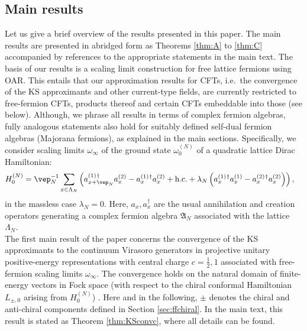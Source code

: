 \documentclass[a4paper, 11pt]{article}
\newcommand{\fA}{\mathfrak{A}}\newcommand{\cA}{\mathcal{A}}\newcommand{\dA}{\mathds{A}}\newcommand{\sA}{\mathscr{A}}
\DeclareMathOperator{\1}{\mathds{1}}
\begin{document}
\subsection{Main results}
\label{sec:main}
Let us give a brief overview of the results presented in this paper. The main results are presented in abridged form as Theorems \ref{thm:A} to \ref{thm:C} accompanied by references to the appropriate statements in the main text. The basis of our results is a scaling limit construction for free lattice fermions using OAR. This entails that our approximation results for CFTs, i.e.~the convergence of the KS approximants and other current-type fields, are currently restricted to free-fermion CFTs, products thereof and certain CFTs embeddable into those (see below). Although, we phrase all results in terms of complex fermion algebras, fully analogous statements also hold for suitably defined self-dual fermion algebras (Majorana fermions), as explained in the main sections. Specifically, we consider scaling limits $\omega_{\infty}$ of the ground state $\omega^{(N)}_{0}$ of a quadratic lattice Dirac Hamiltonian:
\begin{align*}
H^{(N)}_{0} & = \vep_{N}^{-1}\sum_{x\in\Lambda_{N}}\left(a^{(1)\!\!\ \dagger}_{x+\vep_{N}}a^{(2)}_{x} - a^{(1)\!\!\ \dagger}_{x}a^{(2)}_{x} + \textup{h.c.} + \lambda_{N}\left(a^{(1)\!\!\ \dagger}_{x}a^{(1)}_{x} - a^{(2)\!\!\ \dagger}_{x}a^{(2)}_{x}\right)\right),
\end{align*}
in the massless case $\lambda_{N}=0$. Here, $a_{x}, a^{\dag}_{x}$ are the usual annihilation and creation operators generating a complex fermion algebra $\fA_{N}$ associated with the lattice $\Lambda_{N}$.\\

The first main result of the paper concerns the convergence of the KS approximants to the continuum Virasoro generators in projective unitary positive-energy representations with central charge $c=\tfrac{1}{2},1$ associated with free-fermion scaling limits $\omega_{\infty}$. The convergence holds on the natural domain of finite-energy vectors in Fock space (with respect to the chiral conformal Hamiltonian $L_{\pm,0}$ arising from $H^{(N)}_{0}$) \cite{CarpiOnTheUniqueness}. Here and in the following, $\pm$ denotes the chiral and anti-chiral components defined in Section \ref{sec:ffchiral}. In the main text, this result is stated as Theorem \ref{thm:KSconvc}, where all details can be found.
\end{document}
